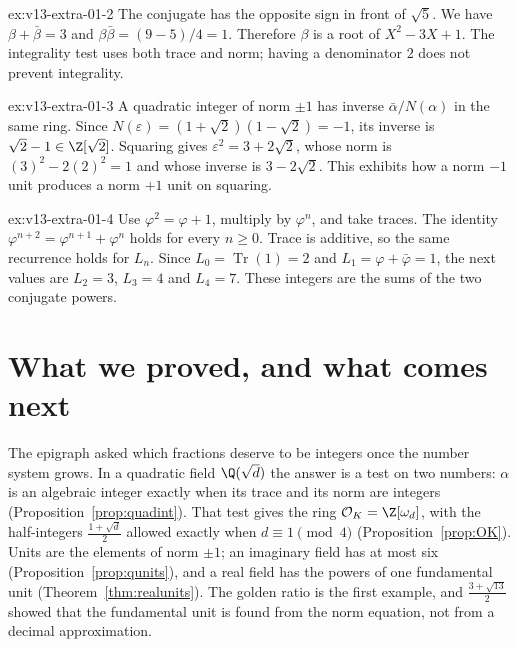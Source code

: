 \begin{solution}{ex:v13-extra-01-2}
\idea The conjugate has the opposite sign in front of $\sqrt5$.
\writeup We have $\beta+\bar\beta=3$ and $\beta\bar\beta=(9-5)/4=1$. Therefore $\beta$ is a root of $X^2-3X+1$. The integrality test uses both trace and norm; having a denominator $2$ does not prevent integrality.
\end{solution}

\begin{solution}{ex:v13-extra-01-3}
\idea A quadratic integer of norm $\pm1$ has inverse $\bar\alpha/N(\alpha)$ in the same ring.
\writeup Since $N(\varepsilon)=(1+\sqrt2)(1-\sqrt2)=-1$, its inverse is $\sqrt2-1\in\Z[\sqrt2]$. Squaring gives $\varepsilon^2=3+2\sqrt2$, whose norm is $(3)^2-2(2)^2=1$ and whose inverse is $3-2\sqrt2$. This exhibits how a norm $-1$ unit produces a norm $+1$ unit on squaring.
\end{solution}

\begin{solution}{ex:v13-extra-01-4}
\idea Use $\varphi^2=\varphi+1$, multiply by $\varphi^n$, and take traces.
\writeup The identity $\varphi^{n+2}=\varphi^{n+1}+\varphi^n$ holds for every $n\ge0$. Trace is additive, so the same recurrence holds for $L_n$. Since $L_0=\operatorname{Tr}(1)=2$ and $L_1=\varphi+\bar\varphi=1$, the next values are $L_2=3$, $L_3=4$ and $L_4=7$. These integers are the sums of the two conjugate powers.
\end{solution}

\section{What we proved, and what comes next}

The epigraph asked which fractions deserve to be integers once the number system grows. In a quadratic field $\Q(\sqrt d)$ the answer is a test on two numbers: $\alpha$ is an algebraic integer exactly when its trace and its norm are integers (Proposition~\ref{prop:quadint}). That test gives the ring $\mathcal O_K=\Z[\omega_d]$, with the half-integers $\frac{1+\sqrt d}2$ allowed exactly when $d\equiv1\pmod4$ (Proposition~\ref{prop:OK}). Units are the elements of norm $\pm1$; an imaginary field has at most six (Proposition~\ref{prop:qunits}), and a real field has the powers of one fundamental unit (Theorem~\ref{thm:realunits}). The golden ratio is the first example, and $\frac{3+\sqrt{13}}2$ showed that the fundamental unit is found from the norm equation, not from a decimal approximation.

